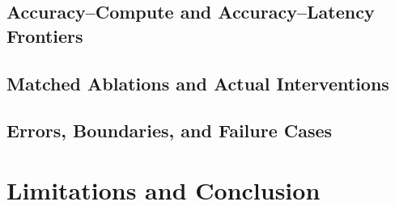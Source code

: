 \documentclass[10pt,twocolumn,letterpaper]{article}
\begin{document}
\subsection{Accuracy--Compute and Accuracy--Latency Frontiers}
\subsection{Matched Ablations and Actual Interventions}
\subsection{Errors, Boundaries, and Failure Cases}
\section{Limitations and Conclusion}


\end{document}
